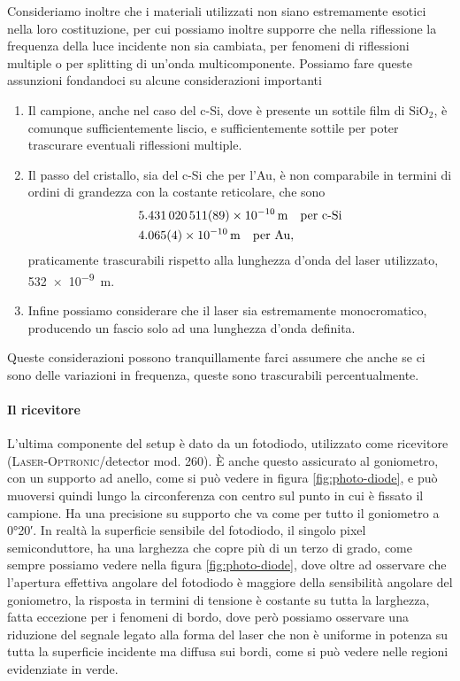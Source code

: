 \documentclass[prb,showpacs,floatfix,altaffilletter,amsmath,amssymb,reprint,citeautoscript,showkeys]{revtex4-1}
\begin{document}
Consideriamo inoltre che i materiali utilizzati non siano estremamente esotici nella loro costituzione, per cui possiamo inoltre supporre che nella riflessione la frequenza della luce incidente non sia cambiata, per fenomeni di riflessioni multiple o per splitting di un'onda multicomponente. Possiamo fare queste assunzioni fondandoci su alcune considerazioni importanti
\begin{enumerate}
    \item Il campione, anche nel caso del c-Si, dove è presente un sottile film di $\mathrm{SiO_2}$, è comunque sufficientemente liscio, e sufficientemente sottile per poter trascurare eventuali riflessioni multiple. 
    \item Il passo del cristallo, sia del c-Si che per l'Au, è non comparabile in termini di ordini di grandezza con la costante reticolare, che sono\cite{BasicParametersSilicon2023, CODATAValueLattice, daveyPrecisionMeasurementsLattice1925, MaterialsDataAu2020, MaterialsDataSi2020, NSMArchivePhysical} \begin{align*}
        &\SI{5.431 020 511(89)e-10}{\metre}\quad\text{per c-Si}\\
        &\SI{4.065+-0.004e-10}{\metre}\quad\text{per Au},
    \end{align*} praticamente trascurabili rispetto alla lunghezza d'onda del laser utilizzato, \SI{532e-9}{\metre}.
    \item Infine possiamo considerare che il laser sia estremamente monocromatico, producendo un fascio solo ad una lunghezza d'onda definita. 
\end{enumerate} Queste considerazioni possono tranquillamente farci assumere che anche se ci sono delle variazioni in frequenza, queste sono trascurabili percentualmente. 

\paragraph*{Il ricevitore} L'ultima componente del setup è dato da un fotodiodo, utilizzato come ricevitore (\textsc{Laser-Optronic}/detector mod. 260). È anche questo assicurato al goniometro, con un supporto ad anello, come si può vedere in figura \ref{fig:photo-diode}, e può muoversi quindi lungo la circonferenza con centro sul punto in cui è fissato il campione. Ha una precisione su supporto che va come per tutto il goniometro a \ang{0;20}. In realtà la superficie sensibile del fotodiodo, il singolo pixel semiconduttore, ha una larghezza che copre più di un terzo di grado, come sempre possiamo vedere nella figura \ref{fig:photo-diode}, dove oltre ad osservare che l'apertura effettiva angolare del fotodiodo è maggiore della sensibilità angolare del goniometro, la risposta in termini di tensione è costante su tutta la larghezza, fatta eccezione per i fenomeni di bordo, dove però possiamo osservare una riduzione del segnale legato alla forma del laser che non è uniforme in potenza su tutta la superficie incidente ma diffusa sui bordi, come si può vedere nelle regioni evidenziate in verde. 
\end{document}
